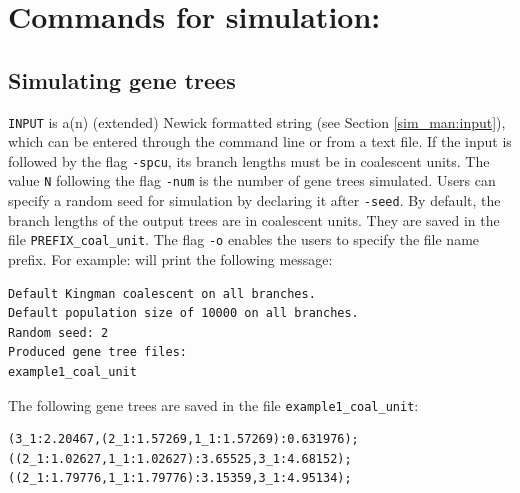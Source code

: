 \section{Commands for simulation:}
\subsection{Simulating gene trees}

{\tt INPUT} is a(n) (extended) Newick formatted string (see Section \ref{sim_man:input}), which can be entered through the command line or from a text file.
If the input is followed by the flag {\tt -spcu}, its branch lengths must be in coalescent units.
The value {\tt N} following the flag {\tt -num} is the number of gene trees simulated.
Users can specify a random seed for simulation by declaring it after {\tt -seed}.
By default, the branch lengths of the output trees are in coalescent units. They are saved in the file {\tt PREFIX\_coal\_unit}. The flag {\tt -o} enables the users to specify the file name prefix. For example:
will print the following message:
\begin{verbatim}
Default Kingman coalescent on all branches.
Default population size of 10000 on all branches. 
Random seed: 2
Produced gene tree files: 
example1_coal_unit
\end{verbatim}
The following gene trees are saved in the file {\tt example1\_coal\_unit}:
\begin{verbatim}
(3_1:2.20467,(2_1:1.57269,1_1:1.57269):0.631976);
((2_1:1.02627,1_1:1.02627):3.65525,3_1:4.68152);
((2_1:1.79776,1_1:1.79776):3.15359,3_1:4.95134);
\end{verbatim}

